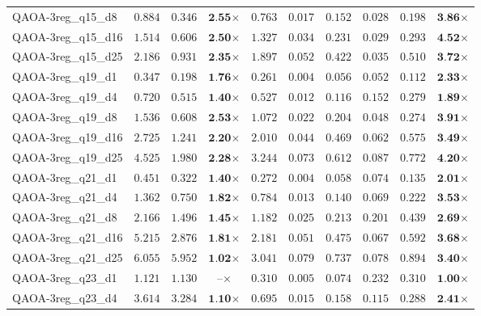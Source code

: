 \begin{table*}[t]
{\begin{tabular}{| l || r r c || r r r r r c |}
QAOA-3reg\_q15\_d8 & $0.884$ & $0.346$ & $\textbf{2.55}$$\times$ & $0.763$ & $0.017$ & $0.152$ & $0.028$ & $0.198$ & $\textbf{3.86}$$\times$ \\
QAOA-3reg\_q15\_d16 & $1.514$ & $0.606$ & $\textbf{2.50}$$\times$ & $1.327$ & $0.034$ & $0.231$ & $0.029$ & $0.293$ & $\textbf{4.52}$$\times$ \\
QAOA-3reg\_q15\_d25 & $2.186$ & $0.931$ & $\textbf{2.35}$$\times$ & $1.897$ & $0.052$ & $0.422$ & $0.035$ & $0.510$ & $\textbf{3.72}$$\times$ \\
QAOA-3reg\_q19\_d1 & $0.347$ & $0.198$ & $\textbf{1.76}$$\times$ & $0.261$ & $0.004$ & $0.056$ & $0.052$ & $0.112$ & $\textbf{2.33}$$\times$ \\
QAOA-3reg\_q19\_d4 & $0.720$ & $0.515$ & $\textbf{1.40}$$\times$ & $0.527$ & $0.012$ & $0.116$ & $0.152$ & $0.279$ & $\textbf{1.89}$$\times$ \\
QAOA-3reg\_q19\_d8 & $1.536$ & $0.608$ & $\textbf{2.53}$$\times$ & $1.072$ & $0.022$ & $0.204$ & $0.048$ & $0.274$ & $\textbf{3.91}$$\times$ \\
QAOA-3reg\_q19\_d16 & $2.725$ & $1.241$ & $\textbf{2.20}$$\times$ & $2.010$ & $0.044$ & $0.469$ & $0.062$ & $0.575$ & $\textbf{3.49}$$\times$ \\
QAOA-3reg\_q19\_d25 & $4.525$ & $1.980$ & $\textbf{2.28}$$\times$ & $3.244$ & $0.073$ & $0.612$ & $0.087$ & $0.772$ & $\textbf{4.20}$$\times$ \\
QAOA-3reg\_q21\_d1 & $0.451$ & $0.322$ & $\textbf{1.40}$$\times$ & $0.272$ & $0.004$ & $0.058$ & $0.074$ & $0.135$ & $\textbf{2.01}$$\times$ \\
QAOA-3reg\_q21\_d4 & $1.362$ & $0.750$ & $\textbf{1.82}$$\times$ & $0.784$ & $0.013$ & $0.140$ & $0.069$ & $0.222$ & $\textbf{3.53}$$\times$ \\
QAOA-3reg\_q21\_d8 & $2.166$ & $1.496$ & $\textbf{1.45}$$\times$ & $1.182$ & $0.025$ & $0.213$ & $0.201$ & $0.439$ & $\textbf{2.69}$$\times$ \\
QAOA-3reg\_q21\_d16 & $5.215$ & $2.876$ & $\textbf{1.81}$$\times$ & $2.181$ & $0.051$ & $0.475$ & $0.067$ & $0.592$ & $\textbf{3.68}$$\times$ \\
QAOA-3reg\_q21\_d25 & $6.055$ & $5.952$ & $\textbf{1.02}$$\times$ & $3.041$ & $0.079$ & $0.737$ & $0.078$ & $0.894$ & $\textbf{3.40}$$\times$ \\
QAOA-3reg\_q23\_d1 & $1.121$ & $1.130$ & $\textbf{--}$$\times$ & $0.310$ & $0.005$ & $0.074$ & $0.232$ & $0.310$ & $\textbf{1.00}$$\times$ \\
QAOA-3reg\_q23\_d4 & $3.614$ & $3.284$ & $\textbf{1.10}$$\times$ & $0.695$ & $0.015$ & $0.158$ & $0.115$ & $0.288$ & $\textbf{2.41}$$\times$ \\

\end{tabular}}
\end{table*}
